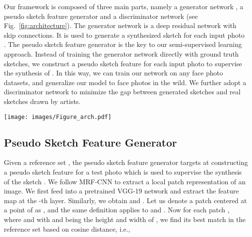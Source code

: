 \documentclass[runningheads]{llncs}
\begin{document}
Our framework is composed of three main parts, namely a generator network , a pseudo sketch feature generator and a discriminator network  (see Fig.~\ref{fig:architecture}). The generator network is a deep residual network with skip connections. It is used to generate a synthesized sketch  for each input photo . The pseudo sketch feature generator is the key to our semi-supervised learning approach. Instead of training the generator network directly with ground truth sketches, we construct a pseudo sketch feature for each input photo to supervise the synthesis of . In this way, we can train our network on any face photo datasets, and generalize our model to face photos in the wild. We further adopt a discriminator network  to minimize the gap between generated sketches and real sketches drawn by artists.
\begin{figure*}[htbp]
\begin{center}
   \texttt{[image: images/Figure\_arch.pdf]}
\end{center}
   \caption{Framework of the proposed method. The generator network is a deep residual network with skip connections. It generates a synthesized sketch from an input photo. The pseudo sketch feature generator utilizes patch matching in the deep feature space to generate a pseudo sketch feature for an input photo in training. The discriminator network tries to distinguish between generated sketches and sketches drawn by artists.}
\label{fig:architecture}
\end{figure*}

\subsection{Pseudo Sketch Feature Generator}
Given a reference set , the pseudo sketch feature generator targets at constructing a pseudo sketch feature  for a test photo  which is used to supervise the synthesis of the sketch . We follow MRF-CNN \cite{li2016combining} to extract a local patch representation of an image.
We first feed  into a pretrained VGG-19 network and extract the feature map  at the -th layer. Similarly, we obtain  and . Let us denote a  patch centered at a point  of  as , and the same definition applies to  and . Now for each patch , where  and  with  and  being the height and width of , we find its best match  in the reference set based on cosine distance, i.e.,
\end{document}
